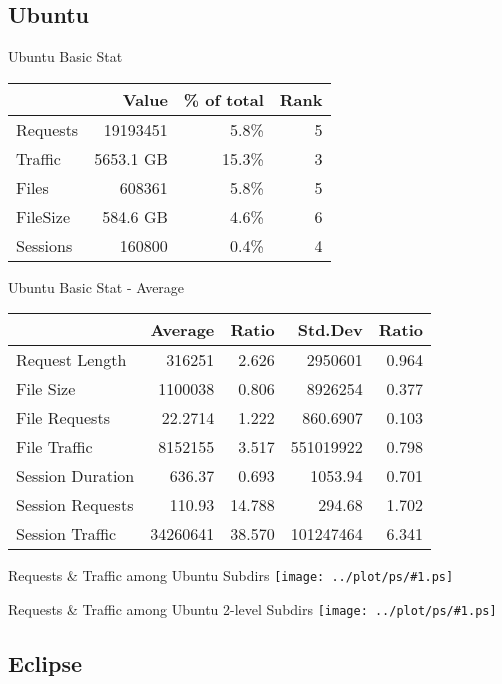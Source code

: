 \documentclass{beamer}
\newcommand\graph[1]{{\texttt{[image: ../plot/ps/\#1.ps]}}}
\begin{document}
\subsection{Ubuntu}

\begin{frame}{Ubuntu Basic Stat}
\begin{tabular}[t]{|l|r|r|r|}
\hline
 & Value & \% of total & Rank \\
\hline
Requests& 19193451 & 5.8\% & 5 \\
Traffic & 5653.1 GB & 15.3\% & 3 \\
Files 	& 608361 & 5.8\% & 5 \\
FileSize& 584.6 GB & 4.6\% & 6 \\
Sessions& 160800 & 0.4\% & 4 \\
\hline
\end{tabular}
\end{frame}

\begin{frame}{Ubuntu Basic Stat - Average}
\begin{tabular}[t]{|l|r|r|r|r|}
\hline
 & Average & Ratio & Std.Dev & Ratio \\
\hline
Request Length	& 316251 & 2.626 & 2950601 & 0.964 \\
File Size	& 1100038 & 0.806 & 8926254 & 0.377 \\
File Requests	& 22.2714 & 1.222 & 860.6907 & 0.103 \\
File Traffic	& 8152155 & 3.517 & 551019922 & 0.798 \\
Session Duration& 636.37 & 0.693 & 1053.94 & 0.701 \\
Session Requests& 110.93 & 14.788 & 294.68 & 1.702 \\
Session Traffic & 34260641 & 38.570 & 101247464 & 6.341 \\
\hline
\end{tabular}
\end{frame}

\begin{frame}{Requests \& Traffic among Ubuntu Subdirs}
\graph{dist-subdir-ubuntu}
\end{frame}

\begin{frame}{Requests \& Traffic among Ubuntu 2-level Subdirs}
\graph{dist-subsubdir-ubuntu}
\end{frame}

\subsection{Eclipse}
\end{document}
